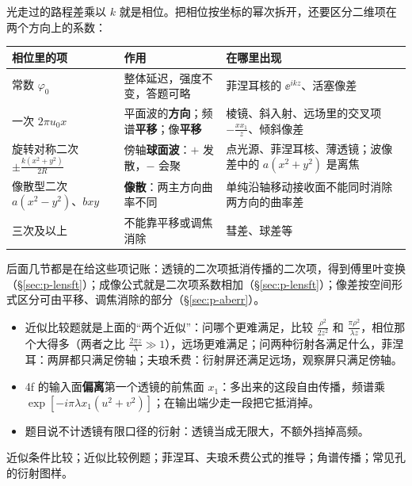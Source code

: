 \begin{idea}
光走过的路程差乘以 $k$ 就是相位。把相位按坐标的幂次拆开，还要区分二维项在两个方向上的系数：
\begin{center}\small\renewcommand{\arraystretch}{1.35}
\begin{tabular}{@{}P{2.6cm}P{4.2cm}P{7.6cm}@{}}
\toprule
相位里的项 & 作用 & 在哪里出现\\ \midrule
常数 $\varphi_0$ & 整体延迟，强度不变，答题可略 & 菲涅耳核的 $\ee^{ikz}$、活塞像差\\
一次 $2\pi u_0x$ & 平面波的\textbf{方向}；频谱\textbf{平移}；像\textbf{平移} & 棱镜、斜入射、远场里的交叉项 $-\frac{xx_1}{z}$、倾斜像差\\
旋转对称二次 $\pm\frac{k(x^2+y^2)}{2R}$ & 傍轴\textbf{球面波}：$+$ 发散，$-$ 会聚 & 点光源、菲涅耳核、薄透镜；波像差中的 $a(x^2+y^2)$ 是离焦\\
像散型二次 $a(x^2-y^2)$、$bxy$ & \textbf{像散}：两主方向曲率不同 & 单纯沿轴移动接收面不能同时消除两方向的曲率差\\
三次及以上 & 不能靠平移或调焦消除 & 彗差、球差等\\
\bottomrule
\end{tabular}
\end{center}
后面几节都是在给这些项记账：透镜的二次项抵消传播的二次项，得到傅里叶变换（§\ref{sec:p-lensft}）；成像公式就是二次项系数相加（§\ref{sec:p-lensft}）；像差按空间形式区分可由平移、调焦消除的部分（§\ref{sec:p-aberr}）。
\end{idea}

\pkao
\begin{itemize}
\item 近似比较题就是上面的“两个近似”：问哪个更难满足，比较 $\frac{\rho^2}{2z^2}$ 和 $\frac{\pi\rho^2}{\lambda z}$，相位那个大得多（两者之比 $\frac{2\pi z}{\lambda}\gg1$），远场更难满足；问两种衍射各满足什么，菲涅耳：两屏都只满足傍轴；夫琅禾费：衍射屏还满足远场，观察屏只满足傍轴。
\item 4f 的输入面\textbf{偏离}第一个透镜的前焦面 $x_1$：多出来的这段自由传播，频谱乘 $\exp[-i\pi\lambda x_1(u^2+v^2)]$；在输出端少走一段把它抵消掉。
\item 题目说不计透镜有限口径的衍射：透镜当成无限大，不额外挡掉高频。
\end{itemize}

\psee 近似条件比较\pageref{box:approx}；近似比较例题\pageref{ex:v-approx}；菲涅耳、夫琅禾费公式的推导\pageref{sec:diffderiv}；角谱传播\pageref{sec:angspec}；常见孔的衍射图样\pageref{sec:aperturepatterns}。

